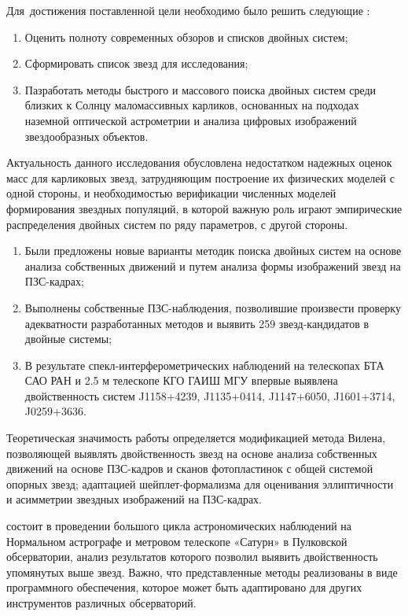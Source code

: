 Для~достижения поставленной цели необходимо было решить следующие {\tasks}:
\begin{enumerate}
  \item Оценить полноту современных обзоров и списков двойных систем;
  \item Сформировать список звезд для исследования;
  \item Пазработать методы быстрого и массового поиска двойных систем среди близких к Солнцу маломассивных карликов, основанных на подходах наземной оптической астрометрии и анализа цифровых изображений звездообразных объектов.
\end{enumerate}

Актуальность данного исследования обусловлена недостатком надежных оценок масс для карликовых звезд, затрудняющим построение их физических моделей с одной стороны, и необходимостью верификации численных моделей формирования звездных популяций, в которой важную роль играют эмпирические распределения двойных систем по ряду параметров, с другой стороны.

{\novelty}
\begin{enumerate}
  \item Были предложены новые варианты методик поиска двойных систем на основе анализа собственных движений и путем анализа формы изображений звезд на ПЗС-кадрах;
  \item Выполнены собственные ПЗС-наблюдения, позволившие произвести проверку адекватности разработанных методов и выявить 259 звезд-кандидатов в двойные системы;
  \item В результате спекл-интерферометрических наблюдений на телескопах БТА САО РАН и 2.5 м телескопе КГО ГАИШ МГУ впервые выявлена двойственность систем J1158+4239, J1135+0414, J1147+6050, J1601+3714, J0259+3636.
\end{enumerate}

Теоретическая значимость работы определяется модификацией метода Вилена, позволяющей выявлять двойственность звезд на основе анализа собственных движений на основе ПЗС-кадров и сканов фотопластинок с общей системой опорных звезд; адаптацией шейплет-формализма для оценивания эллиптичности и асимметрии звездных изображений на ПЗС-кадрах.

{\influence} состоит в проведении большого цикла астрономических наблюдений на Нормальном астрографе и метровом телескопе «Сатурн» в Пулковской обсерватории, анализ результатов которого позволил выявить двойственность упомянутых выше звезд. Важно, что представленные методы реализованы в виде программного обеспечения, которое может быть адаптировано для других инструментов различных обсерваторий.

